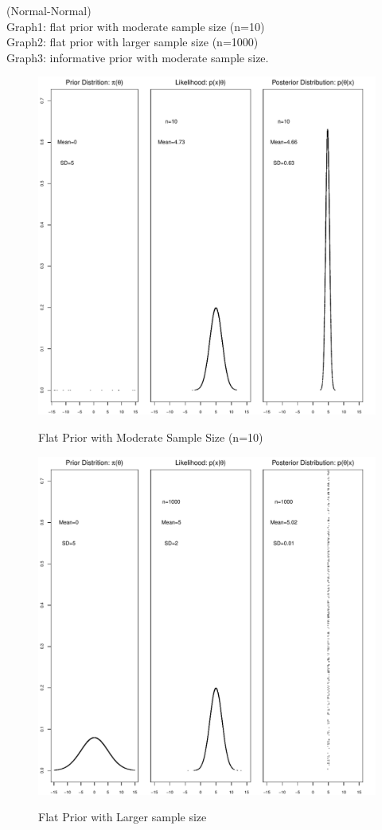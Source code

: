 \documentclass[11pt]{book}
\begin{document}
(Normal-Normal)\\
Graph1: flat prior with moderate sample size (n=10)\\
Graph2: flat prior with larger sample size (n=1000)\\
Graph3: informative prior with moderate sample size.
\begin{figure}
  \centering
  \includegraphics[width=\textwidth]{graph1.pdf}\\
  \caption{Flat Prior with Moderate Sample Size (n=10)}\label{Graph1}
\end{figure}
\begin{figure}
  \centering
  \includegraphics[width=\textwidth]{graph2_largeN.pdf}\\
  \caption{Flat Prior with Larger sample size}\label{Graph2}
\end{figure}
\end{document}
